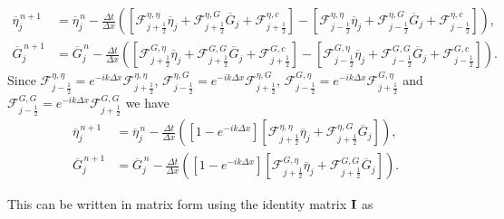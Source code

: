 \begin{align*}
\overline{\eta}_{j}^{\,n + 1} &=  \overline{\eta}^{\,n }_{j} - \frac{\Delta t}{\Delta x}  \left( \left[\mathcal{F}_{j+\frac{1}{2}} ^{\eta,\eta} \overline{\eta}_j  + \mathcal{F}_{j+\frac{1}{2}} ^{\eta,G} \overline{G}_j + \mathcal{F}_{j+\frac{1}{2}} ^{\eta,c} \right] - \left[\mathcal{F}^{\eta,\eta}_{j-\frac{1}{2}}  \overline{\eta}_{j}  + \mathcal{F}^{\eta,G}_{j-\frac{1}{2}} \overline{G}_{j} + \mathcal{F}^{\eta,c}_{j-\frac{1}{2}} \right]  \right), \\
 \overline{G}^{\,n + 1}_{j} &= \overline{G}^{\,n }_{j} -\frac{\Delta t}{\Delta x}  \left( \left[  \mathcal{F}_{j+\frac{1}{2}} ^{G,\eta} \overline{\eta}_{j}  + \mathcal{F}_{j+\frac{1}{2}} ^{G,G} \overline{G}_j + \mathcal{F}_{j+\frac{1}{2}} ^{G,c} \right] - \left[  \mathcal{F}_{j-\frac{1}{2}}^{G,\eta} \overline{\eta}_{j}  + \mathcal{F}^{G,G}_{j-\frac{1}{2}} \overline{G}_{j} + \mathcal{F}^{G,c}_{j-\frac{1}{2}} \right] \right).
\end{align*}
Since $\mathcal{F}^{\eta,\eta}_{j-\frac{1}{2}} = e^{-ik\Delta x} \mathcal{F}^{\eta,\eta}_{j+\frac{1}{2}}$, $\mathcal{F}^{\eta,G}_{j-\frac{1}{2}} = e^{-ik\Delta x} \mathcal{F}^{\eta,G}_{j+\frac{1}{2}}$, $\mathcal{F}^{G,\eta}_{j-\frac{1}{2}} = e^{-ik\Delta x} \mathcal{F}^{G,\eta}_{j+\frac{1}{2}}$ and $\mathcal{F}^{G,G}_{j-\frac{1}{2}} = e^{-ik\Delta x} \mathcal{F}^{G,G}_{j+\frac{1}{2}}$ we have
\begin{align*}
\overline{\eta}_{j}^{\,n + 1} &=  \overline{\eta}^{\,n }_{j} - \frac{\Delta t}{\Delta x}  \left(  \left[1 - e^{-ik\Delta x}\right] \left[\mathcal{F}_{j+\frac{1}{2}}^{\eta,\eta} \overline{\eta}_j  + \mathcal{F}_{j+\frac{1}{2}}^{\eta,G} \overline{G}_j \right] \right), \\
\overline{G}^{\,n + 1}_{j} &= \overline{G}^{\,n }_{j} -\frac{\Delta t}{\Delta x}  \left( \left[1 - e^{-ik\Delta x}\right]\left[  \mathcal{F}_{j+\frac{1}{2}}^{G,\eta} \overline{\eta}_{j}  + \mathcal{F}_{j+\frac{1}{2}}^{G,G} \overline{G}_j \right] \right).
\end{align*}

This can be written in matrix form using the identity matrix $\mathbf{I}$ as

